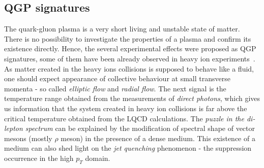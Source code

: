     \subsection{QGP signatures}
      The quark-gluon plasma is a very short living and unstable state of matter.
      There is no possibility to investigate the properties of a plasma and confirm its existence directly.
      Hence, the several experimental effects were proposed as QGP signatures, some of them have been already observed in heavy ion experiments~\cite{drkisiel}.
      As matter created in the heavy ions collisions is supposed to behave like a fluid, one should expect appearance of collective behaviour at small transverse momenta - so called \textit{elliptic flow} and \textit{radial flow}.
      The next signal is the temperature range obtained from the measurements of \textit{direct photons}, which gives us information that the system created in heavy ion collisions is far above the critical temperature obtained from the LQCD calculations.
      The \textit{puzzle in the di-lepton spectrum} can be explained by the modification of spectral shape of vector mesons (mostly $\rho$ meson) in the presence of a dense medium.
      This existence of a medium can also shed light on the \textit{jet quenching} phenomenon - the suppression occurrence in the high $p_T$ domain.
